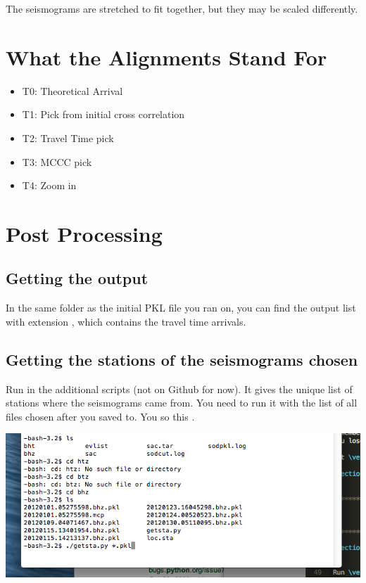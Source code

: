 \documentclass[letterpaper,10pt,english]{sphinxmanual}
\begin{document}
The seismograms are stretched to fit together, but they may be scaled differently.


\section{What the Alignments Stand For}
\label{docfiles/PickingTravelTimes:what-the-alignments-stand-for}\begin{itemize}
\item {} 
T0: Theoretical Arrival

\item {} 
T1: Pick from initial cross correlation

\item {} 
T2: Travel Time pick

\item {} 
T3: MCCC pick

\item {} 
T4: Zoom in

\end{itemize}


\section{Post Processing}
\label{docfiles/PickingTravelTimes:post-processing}

\subsection{Getting the output}
\label{docfiles/PickingTravelTimes:getting-the-output}
In the same folder as the initial PKL file you ran  on, you can find the output list with extension , which contains the travel time arrivals.


\subsection{Getting the stations of the seismograms chosen}
\label{docfiles/PickingTravelTimes:getting-the-stations-of-the-seismograms-chosen}
Run  in the additional scripts (not on Github for now). It gives the unique list of stations where the seismograms came from. You need to run it with the list of all  files chosen after you saved to. You so this .

\includegraphics{count_stations.png}
\end{document}
